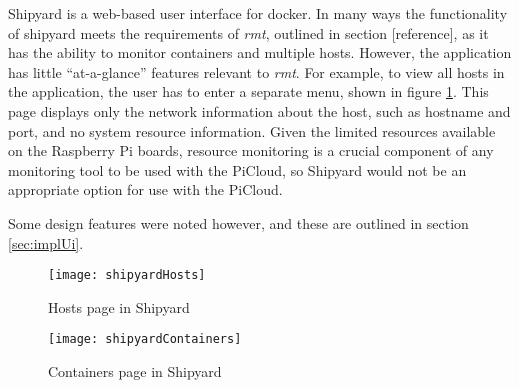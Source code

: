 Shipyard \citep{shipyard} is a web-based user interface for docker.
In many ways the functionality of shipyard meets the requirements of \emph{rmt}, outlined in section [reference], as it has the ability to monitor containers and multiple hosts.
However, the application has little ``at-a-glance'' features relevant to \emph{rmt}.
For example, to view all hosts in the application, the user has to enter a separate menu, shown in figure \ref{fig:shipyardHosts}.
This page displays only the network information about the host, such as hostname and port, and no system resource information.
Given the limited resources available on the Raspberry Pi boards, resource monitoring is a crucial component of any monitoring tool to be used with the PiCloud, so Shipyard would not be an appropriate option for use with the PiCloud.

Some design features were noted however, and these are outlined in section \ref{sec:implUi}.

\begin{figure}[t]
	\centering
	\texttt{[image: shipyardHosts]}
	\caption{Hosts page in Shipyard}
	\label{fig:shipyardHosts}
\end{figure}

\begin{figure}[t]
	\centering
	\texttt{[image: shipyardContainers]}
	\caption{Containers page in Shipyard}
	\label{fig:shipyardContainers}
\end{figure}